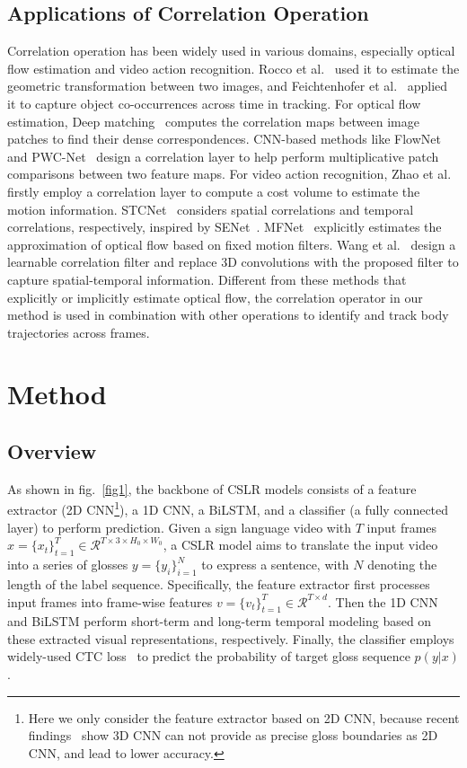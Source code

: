 \documentclass[10pt,twocolumn,letterpaper]{article}
\begin{document}
\subsection{Applications of Correlation Operation}
Correlation operation has been widely used in various domains, especially optical flow estimation and video action recognition. Rocco et al.~\cite{rocco2017convolutional} used it to estimate the geometric transformation between two images, and Feichtenhofer
et al.~\cite{feichtenhofer2017detect} applied it to capture object co-occurrences across time in tracking. For optical flow estimation, Deep matching~\cite{weinzaepfel2013deepflow} computes the correlation maps between image patches to find their dense correspondences. CNN-based methods like FlowNet~\cite{dosovitskiy2015flownet} and PWC-Net~\cite{sun2018pwc} design a correlation layer to help perform multiplicative patch comparisons between two feature maps. For video action recognition, Zhao et al.~\cite{zhao2018recognize} firstly employ a correlation layer to compute a cost volume to estimate the motion information. STCNet~\cite{diba2018spatio} considers spatial correlations and temporal correlations, respectively, inspired by SENet~\cite{hu2018squeeze}. MFNet~\cite{lee2018motion} explicitly estimates the approximation of optical flow based on fixed motion filters. Wang et al.~\cite{wang2020video} design a learnable correlation filter and replace 3D convolutions with the proposed filter to capture spatial-temporal information. Different from these methods that explicitly or implicitly estimate optical flow, the correlation operator in our method is used in combination with other operations to identify and track body trajectories across frames.

\section{Method}
\subsection{Overview}
As shown in fig.~\ref{fig1}, the backbone of CSLR models consists of a feature extractor (2D CNN\footnote{Here we only consider the feature extractor based on 2D CNN, because recent findings~\cite{adaloglou2021comprehensive,zuo2022c2slr} show 3D CNN can not provide as precise gloss boundaries as 2D CNN, and lead to lower accuracy. }), a 1D CNN, a BiLSTM, and a classifier (a fully connected layer) to perform prediction. Given a sign language video with $T$ input frames $x = \{x_{t}\}_{t=1}^T \in \mathcal{R}^{T \times 3\times H_0 \times W_0} $, a CSLR model aims to translate the input video into a series of glosses $y=\{ y_i\}_{i=1}^{N}$ to express a sentence, with $N$ denoting the length of the label sequence. Specifically, the feature extractor first processes input frames into frame-wise features $v = \{v_t\}_{t=1}^{T} \in \mathcal{R}^{T\times d}$. Then the 1D CNN and BiLSTM perform short-term and long-term temporal modeling based on these extracted visual representations, respectively. Finally, the classifier employs widely-used CTC loss~\cite{graves2006connectionist} to predict the probability of target gloss sequence $p(y|x)$.
\end{document}
